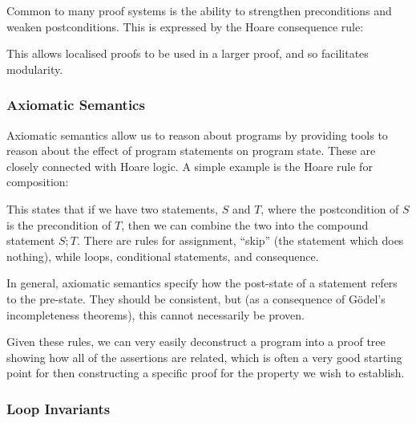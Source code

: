Common to many proof systems is the ability to strengthen
preconditions and weaken postconditions. This is expressed by the
Hoare consequence rule:

\begin{prooftree}
\end{prooftree}

This allows localised proofs to be used in a larger proof, and so
facilitates modularity.

\subsubsection{Axiomatic Semantics}
\label{sec:lit-verification-embedding-axioms}

Axiomatic semantics allow us to reason about programs by providing
tools to reason about the effect of program statements on program
state. These are closely connected with Hoare logic. A simple example
is the Hoare rule for composition:

\begin{prooftree}
\end{prooftree}

This states that if we have two statements, $S$ and $T$, where the
postcondition of $S$ is the precondition of $T$, then we can combine
the two into the compound statement $S;T$\cite{Hoare69}. There are
rules for assignment, ``skip'' (the statement which does nothing),
while loops, conditional statements, and consequence.

In general, axiomatic semantics specify how the post-state of a
statement refers to the pre-state. They should be consistent, but (as
a consequence of G{\"o}del's incompleteness theorems), this cannot
necessarily be proven.

Given these rules, we can very easily deconstruct a program into a
proof tree showing how all of the assertions are related, which is
often a very good starting point for then constructing a specific
proof for the property we wish to establish.

\subsubsection{Loop Invariants}
\label{sec:lit-verification-embedding-invariants}

